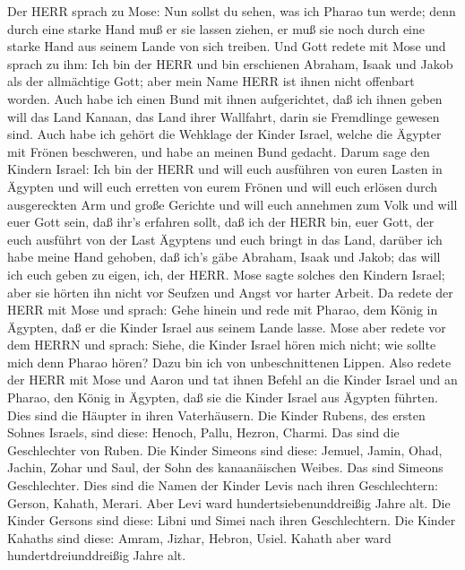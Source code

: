  Der HERR sprach zu Mose: Nun sollst du sehen, was ich
Pharao tun werde; denn durch eine starke Hand muß er sie lassen ziehen,
er muß sie noch durch eine starke Hand aus seinem Lande von sich
treiben.  Und Gott redete mit Mose und sprach zu ihm: Ich
bin der HERR  und bin erschienen Abraham, Isaak und Jakob
als der allmächtige Gott; aber mein Name HERR ist ihnen nicht offenbart
worden.  Auch habe ich einen Bund mit ihnen aufgerichtet,
daß ich ihnen geben will das Land Kanaan, das Land ihrer Wallfahrt,
darin sie Fremdlinge gewesen sind.  Auch habe ich gehört die
Wehklage der Kinder Israel, welche die Ägypter mit Frönen beschweren,
und habe an meinen Bund gedacht.  Darum sage den Kindern
Israel: Ich bin der HERR und will euch ausführen von euren Lasten in
Ägypten und will euch erretten von eurem Frönen und will euch erlösen
durch ausgereckten Arm und große Gerichte  und will euch
annehmen zum Volk und will euer Gott sein, daß ihr's erfahren sollt, daß
ich der HERR bin, euer Gott, der euch ausführt von der Last Ägyptens
 und euch bringt in das Land, darüber ich habe meine Hand
gehoben, daß ich's gäbe Abraham, Isaak und Jakob; das will ich euch
geben zu eigen, ich, der HERR.  Mose sagte solches den
Kindern Israel; aber sie hörten ihn nicht vor Seufzen und Angst vor
harter Arbeit.  Da redete der HERR mit Mose und sprach:
 Gehe hinein und rede mit Pharao, dem König in Ägypten, daß
er die Kinder Israel aus seinem Lande lasse.  Mose aber
redete vor dem HERRN und sprach: Siehe, die Kinder Israel hören mich
nicht; wie sollte mich denn Pharao hören? Dazu bin ich von
unbeschnittenen Lippen.  Also redete der HERR mit Mose und
Aaron und tat ihnen Befehl an die Kinder Israel und an Pharao, den König
in Ägypten, daß sie die Kinder Israel aus Ägypten führten. 
Dies sind die Häupter in ihren Vaterhäusern. Die Kinder Rubens, des
ersten Sohnes Israels, sind diese: Henoch, Pallu, Hezron, Charmi. Das
sind die Geschlechter von Ruben.  Die Kinder Simeons sind
diese: Jemuel, Jamin, Ohad, Jachin, Zohar und Saul, der Sohn des
kanaanäischen Weibes. Das sind Simeons Geschlechter.  Dies
sind die Namen der Kinder Levis nach ihren Geschlechtern: Gerson,
Kahath, Merari. Aber Levi ward hundertsiebenunddreißig Jahre alt.
 Die Kinder Gersons sind diese: Libni und Simei nach ihren
Geschlechtern.  Die Kinder Kahaths sind diese: Amram,
Jizhar, Hebron, Usiel. Kahath aber ward hundertdreiunddreißig Jahre alt.
